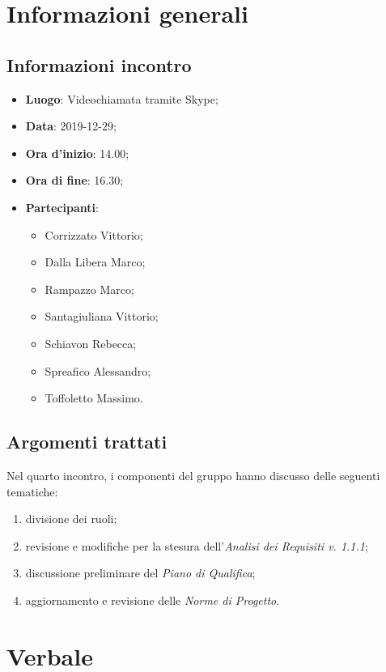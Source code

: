 \section{Informazioni generali}
    \subsection{Informazioni incontro}
        \begin{itemize}
            \item \textbf{Luogo}: Videochiamata tramite Skype;
            \item \textbf{Data}: 2019-12-29;
            \item \textbf{Ora d'inizio}: 14.00;
            \item \textbf{Ora di fine}: 16.30;
            \item \textbf{Partecipanti}: 
            \begin{itemize}
                \item Corrizzato Vittorio;
                \item Dalla Libera Marco;
                \item Rampazzo Marco;
                \item Santagiuliana Vittorio;
                \item Schiavon Rebecca;
                \item Spreafico Alessandro;
                \item Toffoletto Massimo.
            \end{itemize}
        \end{itemize}
    \subsection{Argomenti trattati}
        Nel quarto incontro, i componenti del gruppo hanno discusso delle seguenti tematiche:
        \begin{enumerate}
        	\item divisione dei ruoli;
        	\item revisione e modifiche per la stesura dell'\textit{Analisi dei Requisiti v. 1.1.1};
            \item discussione preliminare del \textit{Piano di Qualifica};
            \item aggiornamento e revisione delle \textit{Norme di Progetto}.
        \end{enumerate}
\section{Verbale}
